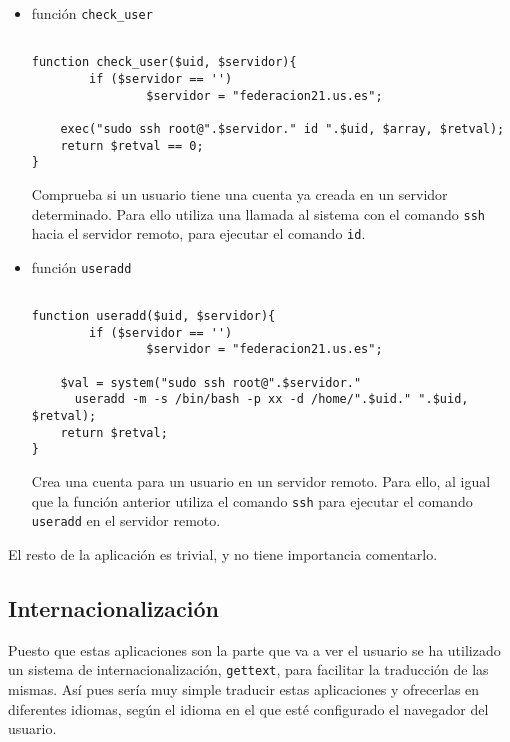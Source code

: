     \begin{itemize}

    \item función \texttt{check\_user}

    \begin{lstlisting}

function check_user($uid, $servidor){
        if ($servidor == '')
                $servidor = "federacion21.us.es";

	exec("sudo ssh root@".$servidor." id ".$uid, $array, $retval);
	return $retval == 0;
}

    \end{lstlisting}

    Comprueba si un usuario tiene una cuenta ya creada en un servidor
    determinado. Para ello utiliza una llamada al sistema con el
    comando \texttt{ssh} hacia el servidor remoto, para ejecutar el comando
    \texttt{id}.

    \item función \texttt{useradd}

    \begin{lstlisting}

function useradd($uid, $servidor){
        if ($servidor == '')
                $servidor = "federacion21.us.es";

	$val = system("sudo ssh root@".$servidor." 
      useradd -m -s /bin/bash -p xx -d /home/".$uid." ".$uid, $retval);
	return $retval;
}

    \end{lstlisting}

    Crea una cuenta para un usuario en un servidor remoto. Para ello,
    al igual que la función anterior utiliza el comando \texttt{ssh}
    para ejecutar el comando \texttt{useradd} en el servidor remoto.

    \end{itemize}
    
    El resto de la aplicación es trivial, y no tiene importancia
    comentarlo.

\subsection{Internacionalización}

    Puesto que estas aplicaciones son la parte que va a ver el
    usuario se ha utilizado un sistema de internacionalización,
    \texttt{gettext}, para facilitar la traducción de las mismas. Así
    pues sería muy simple traducir estas aplicaciones y ofrecerlas en
    diferentes idiomas, según el idioma en el que esté configurado el
    navegador del usuario.

